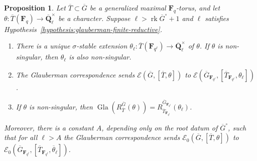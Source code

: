 \documentclass[reqno]{amsart}
\numberwithin{equation}{subsection}
\newcommand{\F}{\mathbf{F}}
\newcommand{\Q}{\mathbf{Q}}
\newcommand{\ol}[1]{\overline{#1}}
\newcommand{\co}{\colon}
\newcommand\cE{\mathcal{E}}
\DeclareMathOperator{\rk}{rk}
\DeclareMathOperator{\Gla}{Gla}
\newtheorem{prop}[thm]{Proposition}
\theoremstyle{remark}
\numberwithin{equation}{subsection}
\numberwithin{figure}{subsection}
\begin{document}
\begin{prop}\label{prop:digne-3.5}
    Let $\ol T \subset \ol G$ be a generalized maximal $\F_q$-torus, and let $\theta\co \ol T(\F_q) \to \ol\Q_\ell^\times$ be a character. Suppose $\ell > \rk \ol G^\circ + 1$ and $\ell$ satisfies Hypothesis~\ref{hypothesis:glauberman-finite-reductive}.
    \begin{enumerate}
        \item There is a unique $\sigma$-stable extension $\theta_\ell\co \ol T(\F_{q^\ell}) \to \ol\Q_\ell^\times$ of $\theta$. If $\theta$ is non-singular, then $\theta_\ell$ is also non-singular.
        \item The Glauberman correspondence sends $\cE(\ol G, [\ol T, \theta])$ to $\cE(\ol G_{\F_{q^\ell}}, [\ol T_{\F_{q^\ell}}, \theta_\ell])$.
        \item If $\theta$ is non-singular, then $\Gla(R_{\ol T}^{\ol G}(\theta)) = R_{\ol T_{\F_{q^\ell}}}^{\ol G_{\F_{q^\ell}}}(\theta_\ell)$.
    \end{enumerate}
    Moreover, there is a constant $A$, depending only on the root datum of $\ol G^\circ$, such that for all $\ell > A$ the Glauberman correspondence sends $\cE_0(\ol G, [\ol T, \theta])$ to $\cE_0(\ol G_{\F_{q^\ell}}, [\ol T_{\F_{q^\ell}}, \ol\theta_\ell])$.
\end{prop}
\end{document}
